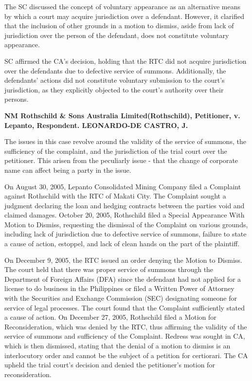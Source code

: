 \documentclass[
12pt,
oneside,
onehalfspacing,
headsepline
]{DigestCollection}
\begin{document}
The SC discussed the concept of voluntary appearance as an alternative means by which a court may acquire jurisdiction over a defendant. However, it clarified that the inclusion of other grounds in a motion to dismiss, aside from lack of jurisdiction over the person of the defendant, does not constitute voluntary appearance.

SC affirmed the CA's decision, holding that the RTC did not acquire jurisdiction over the defendants due to defective service of summons. Additionally, the defendants' actions did not constitute voluntary submission to the court's jurisdiction, as they explicitly objected to the court's authority over their persons. 



\noindent\textbf{NM Rothschild \& Sons Australia Limited(Rothschild), Petitioner, v. \\Lepanto, Respondent. LEONARDO-DE CASTRO, J.}\vspace{0.4cm}

The issues in this case revolve around the validity of the service of summons, the sufficiency of the complaint, and the jurisdiction of the trial court over the petitioner. This arisen from the peculiarly issue - that the change of corporate name can affect being a party in the issue.

On August 30, 2005, Lepanto Consolidated Mining Company filed a Complaint against Rothschild with the RTC of Makati City. The Complaint sought a judgment declaring the loan and hedging contracts between the parties void and claimed damages. October 20, 2005, Rothschild filed a Special Appearance With Motion to Dismiss, requesting the dismissal of the Complaint on various grounds, including lack of jurisdiction due to defective service of summons, failure to state a cause of action, estoppel, and lack of clean hands on the part of the plaintiff. 

On December 9, 2005, the RTC issued an order denying the Motion to Dismiss. The court held that there was proper service of summons through the Department of Foreign Affairs (DFA) since the defendant had not applied for a license to do business in the Philippines or filed a Written Power of Attorney with the Securities and Exchange Commission (SEC) designating someone for service of legal processes. The court found that the Complaint sufficiently stated a cause of action. On December 27, 2005, Rothschild filed a Motion for Reconsideration, which was denied by the RTC, thus affirming the validity of the service of summons and sufficiency of the Complaint. Redress was sought in CA, which is then dismissed, stating that the denial of a motion to dismiss is an interlocutory order and cannot be the subject of a petition for certiorari. The CA upheld the trial court's decision and denied the petitioner's motion for reconsideration.
\end{document}
